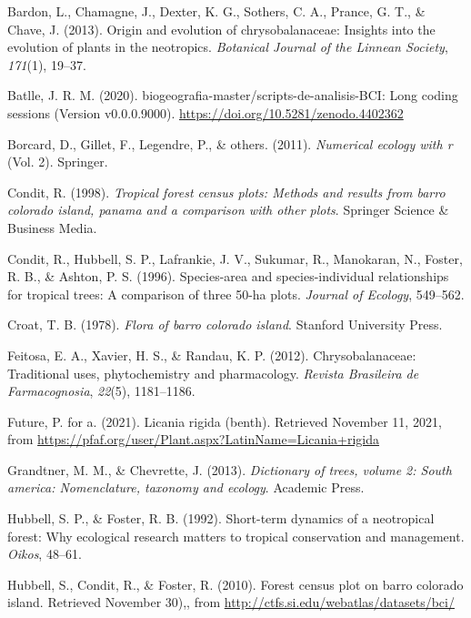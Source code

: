 \documentclass[11pt,]{article}
\begin{document}
\hypertarget{refs}{}
\hypertarget{ref-bardon2013origin}{}
Bardon, L., Chamagne, J., Dexter, K. G., Sothers, C. A., Prance, G. T.,
\& Chave, J. (2013). Origin and evolution of chrysobalanaceae: Insights
into the evolution of plants in the neotropics. \emph{Botanical Journal
of the Linnean Society}, \emph{171}(1), 19--37.

\hypertarget{ref-jose_ramon_martinez_batlle_2020_4402362}{}
Batlle, J. R. M. (2020). biogeografia-master/scripts-de-analisis-BCI:
Long coding sessions (Version v0.0.0.9000).
\url{https://doi.org/10.5281/zenodo.4402362}

\hypertarget{ref-borcard2011numerical}{}
Borcard, D., Gillet, F., Legendre, P., \& others. (2011).
\emph{Numerical ecology with r} (Vol. 2). Springer.

\hypertarget{ref-condit1998tropical}{}
Condit, R. (1998). \emph{Tropical forest census plots: Methods and
results from barro colorado island, panama and a comparison with other
plots}. Springer Science \& Business Media.

\hypertarget{ref-condit1996species}{}
Condit, R., Hubbell, S. P., Lafrankie, J. V., Sukumar, R., Manokaran,
N., Foster, R. B., \& Ashton, P. S. (1996). Species-area and
species-individual relationships for tropical trees: A comparison of
three 50-ha plots. \emph{Journal of Ecology}, 549--562.

\hypertarget{ref-croat1978flora}{}
Croat, T. B. (1978). \emph{Flora of barro colorado island}. Stanford
University Press.

\hypertarget{ref-feitosa2012chrysobalanaceae}{}
Feitosa, E. A., Xavier, H. S., \& Randau, K. P. (2012).
Chrysobalanaceae: Traditional uses, phytochemistry and pharmacology.
\emph{Revista Brasileira de Farmacognosia}, \emph{22}(5), 1181--1186.

\hypertarget{ref-PfafLrigida}{}
Future, P. for a. (2021). Licania rigida (benth). Retrieved November 11,
2021, from
\url{https://pfaf.org/user/Plant.aspx?LatinName=Licania+rigida}

\hypertarget{ref-grandtner2013dictionary}{}
Grandtner, M. M., \& Chevrette, J. (2013). \emph{Dictionary of trees,
volume 2: South america: Nomenclature, taxonomy and ecology}. Academic
Press.

\hypertarget{ref-hubbell1992short}{}
Hubbell, S. P., \& Foster, R. B. (1992). Short-term dynamics of a
neotropical forest: Why ecological research matters to tropical
conservation and management. \emph{Oikos}, 48--61.

\hypertarget{ref-Hubbell2010Forest}{}
Hubbell, S., Condit, R., \& Foster, R. (2010). Forest census plot on
barro colorado island. Retrieved November 30),, from
\url{http://ctfs.si.edu/webatlas/datasets/bci/}
\end{document}
